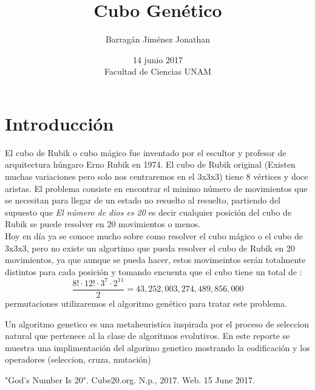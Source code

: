 \documentclass[oneside,10pt]{article}
\begin{document}
\author{Barragán Jim\'enez Jonathan}
\date{14 junio 2017\\ Facultad de Ciencias UNAM}
\title{Cubo Gen\'etico }
\maketitle


\section{Introducción}

El cubo de Rubik o cubo m\'agico fue inventado  por el escultor y profesor de arquitectura h\'ungaro Erno Rubik en 1974. El cubo de Rubik original (Existen muchas variaciones pero solo nos centraremos en el 3x3x3) tiene 8 v\'ertices y doce aristas. El problema consiste en encontrar el minimo n\'umero de movimientos que se necesitan para llegar de un estado no resuelto al resuelto, partiendo del supuesto que  \textsl{El n\'umero de dios es 20}\cite{god20}  es decir cualquier posici\'on del cubo de Rubik se puede resolver en 20 movimientos o menos. \\ 

Hoy en d\'ia ya se conoce mucho sobre como resolver el cubo m\'agico o el cubo de 3x3x3, pero no existe un algortimo que pueda resolver el cubo de Rubik en 20 movimientos, ya que aunque se pueda hacer, estos movimeintos ser\'an totalmente distintos para cada posici\'on y tomando encuenta que el cubo tiene un total de :  \[ \frac{8! \cdot 12! \cdot 3^{7} \cdot 2^{11} }{2} = 43,252,003,274,489,856,000 \] permutaciones utilizaremos el algoritmo gen\'etico para tratar este problema.

Un algoritmo genetico es una metaheuristica inspirada por el proceso de seleccion natural que pertenece al la clase de algoritmos evolutivos. En este reporte se muestra una implimentaci\'on del algorimo genetico mostrando la codificaci\'on y los operadores (seleccion, cruza, mutaci\'on) 

\begin{thebibliography}{99}
 "God's Number Is 20". Cube20.org. N.p., 2017. Web. 15 June 2017.


\end{thebibliography}
\end{document}
